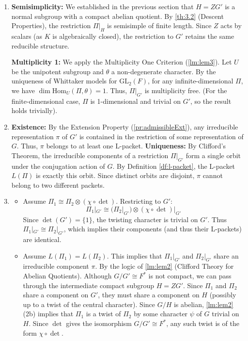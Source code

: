\documentclass{article}
\begin{document}
\begin{Proof}
  \begin{enumerate}
    \item \textbf{Semisimplicity:} We established in the previous section that \(H = ZG'\) is a normal subgroup with a compact abelian quotient. By \cref{th:3.2} (Descent Properties), the restriction \(\Pi|_H\) is semisimple of finite length. Since \(Z\) acts by scalars (as \(K\) is algebraically closed), the restriction to \(G'\) retains the same reducible structure.

    \textbf{Multiplicity 1:} We apply the Multiplicity One Criterion (\cref{lm:lem3}). Let \(U\) be the unipotent subgroup and \(\theta\) a non-degenerate character. By the uniqueness of Whittaker models for \(\mathrm{GL}_2(F)\), for any infinite-dimensional \(\Pi\), we have \(\dim \mathrm{Hom}_U(\Pi, \theta) = 1\). Thus, \(\Pi|_{G'}\) is multiplicity free. (For the finite-dimensional case, \(\Pi\) is 1-dimensional and trivial on \(G'\), so the result holds trivially).

    \item \textbf{Existence:} By the Extension Property (\cref{pr:admissibleExt}), any irreducible representation \(\pi\) of \(G'\) is contained in the restriction of some representation of \(G\). Thus, \(\pi\) belongs to at least one L-packet.
    \textbf{Uniqueness:} By Clifford's Theorem, the irreducible components of a restriction \(\Pi|_{G'}\) form a single orbit under the conjugation action of \(G\). By Definition \ref{df:l-packet}, the L-packet \(L(\Pi)\) is exactly this orbit. Since distinct orbits are disjoint, \(\pi\) cannot belong to two different packets.

    \item
    \begin{itemize}
        \item[($\Leftarrow$)] Assume \(\Pi_1 \cong \Pi_2 \otimes (\chi \circ \det)\). Restricting to \(G'\):
        \[ \Pi_1|_{G'} \cong (\Pi_2|_{G'}) \otimes (\chi \circ \det)|_{G'} \]
        Since \(\det(G') = \{1\}\), the twisting character is trivial on \(G'\). Thus \(\Pi_1|_{G'} \cong \Pi_2|_{G'}\), which implies their components (and thus their L-packets) are identical.

        \item[($\Rightarrow$)] Assume \(L(\Pi_1) = L(\Pi_2)\). This implies that \(\Pi_1|_{G'}\) and \(\Pi_2|_{G'}\) share an irreducible component \(\pi\).
        By the logic of \cref{lm:lem2} (Clifford Theory for Abelian Quotients). Although \(G/G' \cong F^*\) is not compact, we can pass through the intermediate compact subgroup \(H = ZG'\).
        Since \(\Pi_1\) and \(\Pi_2\) share a component on \(G'\), they must share a component on \(H\) (possibly up to a twist of the central character).
        Since \(G/H\) is abelian, \cref{lm:lem2}(2b) implies that \(\Pi_1\) is a twist of \(\Pi_2\) by some character \(\psi\) of \(G\) trivial on \(H\).
        Since \(\det\) gives the isomorphism \(G/G' \cong F^*\), any such twist is of the form \(\chi \circ \det\).
    \end{itemize}
  \end{enumerate}
\end{Proof}
\end{document}
